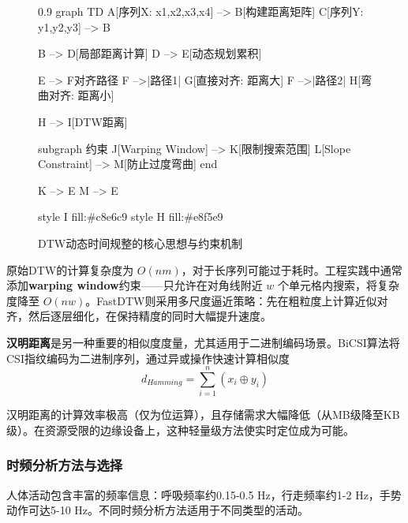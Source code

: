 \begin{figure}[htbp]
    \centering
    \begin{mmd}{0.9\textwidth}
graph TD
    A[序列X: x1,x2,x3,x4] --> B[构建距离矩阵]
    C[序列Y: y1,y2,y3] --> B
    
    B --> D[局部距离计算]
    D --> E[动态规划累积]
    
    E --> F{对齐路径}
    F -->|路径1| G[直接对齐: 距离大]
    F -->|路径2| H[弯曲对齐: 距离小]
    
    H --> I[DTW距离]
    
    subgraph 约束
        J[Warping Window] --> K[限制搜索范围]
        L[Slope Constraint] --> M[防止过度弯曲]
    end
    
    K --> E
    M --> E
    
    style I fill:#c8e6c9
    style H fill:#e8f5e9
    \end{mmd}
    \caption{DTW动态时间规整的核心思想与约束机制}
    \label{fig:dtw-concept}
\end{figure}

原始DTW的计算复杂度为 $O(nm)$，对于长序列可能过于耗时。工程实践中通常添加\textbf{warping window}约束——只允许在对角线附近 $w$ 个单元格内搜索，将复杂度降至 $O(nw)$。FastDTW则采用多尺度逼近策略：先在粗粒度上计算近似对齐，然后逐层细化，在保持精度的同时大幅提升速度。

\textbf{汉明距离}是另一种重要的相似度度量，尤其适用于二进制编码场景。BiCSI算法将CSI指纹编码为二进制序列，通过异或操作快速计算相似度
\begin{equation}
    d_{Hamming} = \sum_{i=1}^{n}(x_i \oplus y_i)
\end{equation}

汉明距离的计算效率极高（仅为位运算），且存储需求大幅降低（从MB级降至KB级）。在资源受限的边缘设备上，这种轻量级方法使实时定位成为可能。

\subsubsection{时频分析方法与选择}

人体活动包含丰富的频率信息：呼吸频率约0.15-0.5 Hz，行走频率约1-2 Hz，手势动作可达5-10 Hz。不同时频分析方法适用于不同类型的活动。


